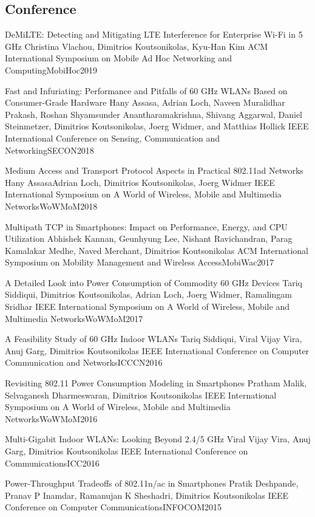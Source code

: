 \subsection{Conference}
{DeMiLTE: Detecting and Mitigating LTE Interference for Enterprise Wi-Fi in 5 GHz}
{Christina Vlachou, Dimitrios Koutsonikolas, Kyu-Han Kim}
{ACM International Symposium on Mobile Ad Hoc Networking and Computing}{MobiHoc}{2019}

{Fast and Infuriating: Performance and Pitfalls of 60 GHz WLANs Based on Consumer-Grade Hardware}
{Hany Assasa, Adrian Loch, Naveen Muralidhar Prakash, Roshan Shyamsunder Anantharamakrishna, Shivang Aggarwal, Daniel Steinmetzer, Dimitrios Koutsonikolas, Joerg Widmer, and Matthias Hollick}
{IEEE International Conference on Sensing, Communication and Networking}{SECON}{2018}

{Medium Access and Transport Protocol Aspects in Practical 802.11ad Networks}
{Hany Assasa}{Adrian Loch, Dimitrios Koutsonikolas, Joerg Widmer}
{IEEE International Symposium on A World of Wireless, Mobile and Multimedia Networks}{WoWMoM}{2018}

{Multipath TCP in Smartphones: Impact on Performance, Energy, and CPU Utilization}
{Abhishek Kannan, Geunhyung Lee, Nishant Ravichandran, Parag Kamalakar Medhe, Naved Merchant, Dimitrios Koutsonikolas}
{ACM International Symposium on Mobility Management and Wireless Access}{MobiWac}{2017}

{A Detailed Look into Power Consumption of Commodity 60 GHz Devices}
{Tariq Siddiqui, Dimitrios Koutsonikolas, Adrian Loch, Joerg Widmer, Ramalingam Sridhar}
{IEEE International Symposium on A World of Wireless, Mobile and Multimedia Networks}{WoWMoM}{2017}

{A Feasibility Study of 60 GHz Indoor WLANs}
{Tariq Siddiqui, Viral Vijay Vira, Anuj Garg, Dimitrios Koutsonikolas}
{IEEE International Conference on Computer Communication and Networks}{ICCCN}{2016}

{Revisiting 802.11 Power Consumption Modeling in Smartphones}
{Pratham Malik, Selvaganesh Dharmeswaran, Dimitrios Koutsonikolas}
{IEEE International Symposium on A World of Wireless, Mobile and Multimedia Networks}{WoWMoM}{2016}

{Multi-Gigabit Indoor WLANs: Looking Beyond 2.4/5 GHz}
{Viral Vijay Vira, Anuj Garg, Dimitrios Koutsonikolas}
{IEEE International Conference on Communications}{ICC}{2016}

{Power-Throughput Tradeoffs of 802.11n/ac in Smartphones}
{Pratik Deshpande, Pranav P Inamdar, Ramanujan K Sheshadri, Dimitrios Koutsonikolas}
{IEEE Conference on Computer Communications}{INFOCOM}{2015}

